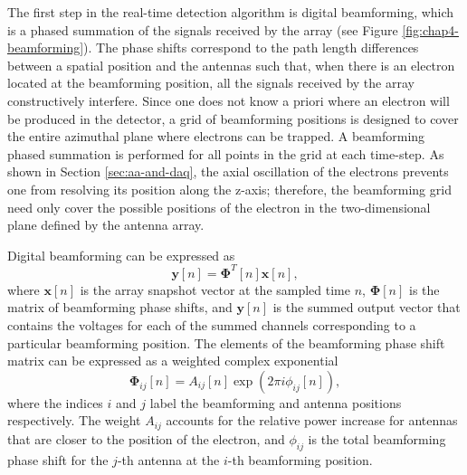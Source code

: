 The first step in the real-time detection algorithm is digital beamforming, which is a phased summation of the signals received by the array (see Figure \ref{fig:chap4-beamforming}). The phase shifts correspond to the path length differences between a spatial position and the antennas such that, when there is an electron located at the beamforming position, all the signals received by the array constructively interfere. Since one does not know a priori where an electron will be produced in the detector, a grid of beamforming positions is designed to cover the entire azimuthal plane where electrons can be trapped. A beamforming phased summation is performed for all points in the grid at each time-step. As shown in Section \ref{sec:aa-and-daq}, the axial oscillation of the electrons prevents one from resolving its position along the z-axis; therefore, the beamforming grid need only cover the possible positions of the electron in the two-dimensional plane defined by the antenna array. 

Digital beamforming can be expressed as
\begin{equation}
    \mathbf{y}[n] = \mathbf{\Phi}^T[n]\mathbf{x}[n],
    \label{eq:beamforming}
\end{equation}
where $\mathbf{x}[n]$ is the array snapshot vector at the sampled time $n$, $\mathbf{\Phi}[n]$ is the matrix of beamforming phase shifts, and $\mathbf{y}[n]$ is the summed output vector that contains the voltages for each of the summed channels corresponding to a particular beamforming position. %
The elements of the beamforming phase shift matrix can be expressed as a weighted complex exponential
\begin{equation}
    \mathbf{\Phi}_{ij}[n]=A_{ij}[n]\exp{\left(2\pi i\phi_{ij}[n]\right)},
\end{equation}
where the indices $i$ and $j$ label the beamforming and antenna positions respectively. The weight $A_{ij}$ accounts for the relative power increase for antennas that are closer to the position of the electron, and $\phi_{ij}$ is the total beamforming phase shift for the $j$-th antenna at the $i$-th beamforming position.

